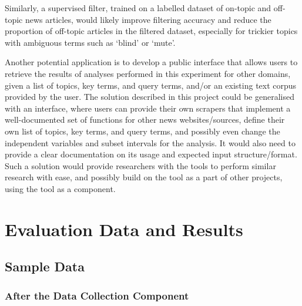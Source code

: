 \documentclass{report}
\begin{document}
Similarly, a supervised filter, trained on a labelled dataset of on-topic and off-topic news articles, would likely improve filtering accuracy and reduce the proportion of off-topic articles in the filtered dataset, especially for trickier topics with ambiguous terms such as `blind' or `mute'.

Another potential application is to develop a public interface that allows users to retrieve the results of analyses performed in this experiment for other domains, given a list of topics, key terms, and query terms, and/or an existing text corpus provided by the user.
The solution described in this project could be generalised with an interface, where users can provide their own scrapers that implement a well-documented set of functions for other news websites/sources, define their own list of topics, key terms, and query terms, and possibly even change the independent variables and subset intervals for the analysis.
It would also need to provide a clear documentation on its usage and expected input structure/format.
Such a solution would provide researchers with the tools to perform similar research with ease, and possibly build on the tool as a part of other projects, using the tool as a component.

\appendix
{}  %

\printbibliography[heading=bibintoc]

\chapter{Evaluation Data and Results}  %

\section{Sample Data}

\subsection{After the Data Collection Component}
\end{document}
